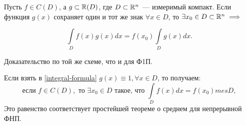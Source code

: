 \documentclass[../../main.tex]{subfiles}
\begin{document}
\begin{crl*}
	Пусть $f \in C(D)$, а $g \subset \mathbb{R}(D)$, где $D \subset \mathbb{R}^n$~---
	 измеримый компакт. Если функция $g(x)$ сохраняет один и 
	 тот же знак $\forall x \in D $, то $\exists x_0 \in D \subset \mathbb{R}^n \implies$
	
	\begin{equation}
	\label{integral-formula}
	\int\limits_D f(x)g(x)dx =
	f(x_0)\int\limits_Dg(x)dx.
	\end{equation}
	
	Доказательство по той же схеме, что и для Ф1П.
\end{crl*}


\begin{rem}
	Если взять в \eqref{integral-formula} 
	$g(x) \equiv 1, \forall x \in D$, то получаем:
	\[
		\text{если } f \in C(D), 
		\text{ то }\exists x_0 \in D 
		\text{ такое, что } \int\limits_Df(x)dx = f(x_0) mes D,
	\]
	Это равенство соответствует простейшей теореме о 
	среднем для непрерывной ФНП.
\end{rem}
	
\end{document}

